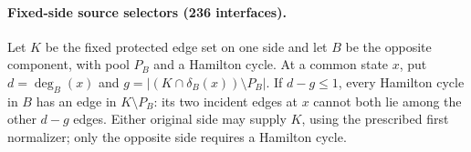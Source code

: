 \paragraph{Fixed-side source selectors (236 interfaces).}
Let $K$ be the fixed protected edge set on one side and let $B$ be the
opposite component, with pool $P_B$ and a Hamilton cycle. At a common
state $x$, put $d=\deg_B(x)$ and
$g=|(K\cap\delta_B(x))\setminus P_B|$.
If $d-g\le1$, every Hamilton cycle in $B$ has an edge in $K\setminus P_B$:
its two incident edges at $x$ cannot both lie among the other $d-g$ edges.
Either original side may supply $K$, using the prescribed first normalizer;
only the opposite side requires a Hamilton cycle.
